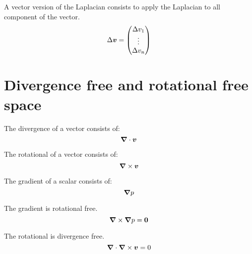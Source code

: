 \begin{definition}
A vector version of the Laplacian consists to apply the Laplacian to all component of the vector.
\begin{equation}
 \Delta {\boldsymbol {v}}=\begin{pmatrix} \Delta v_{1}\\
                  \vdots\\ \Delta v_{n}
                 \end{pmatrix}
\end{equation}
\end{definition}
\section{Divergence free and rotational free space}

\begin{definition}[Divergence]
 The divergence of a vector consists of:
 \begin{equation}
  {\boldsymbol {\nabla}} \cdot {\boldsymbol {v}}
  \end{equation}
\end{definition}

\begin{definition}[Rotational]
 The rotational of a vector consists of:
 \begin{equation}
  {\boldsymbol {\nabla}} \times {\boldsymbol {v}}
 \end{equation}
\end{definition}

\begin{definition}[Gradient]
 The gradient of a scalar consists of:
 \begin{equation}
  {\boldsymbol {\nabla}} p
 \end{equation}
\end{definition}

\begin{property}
 The gradient is rotational free.
 \begin{equation}
  {\boldsymbol {\nabla}}\times {\boldsymbol {\nabla}} p={\boldsymbol {0}}
 \end{equation}
\end{property}

\begin{property}
The rotational is divergence free.
 \begin{equation}
  {\boldsymbol {\nabla}}\cdot {\boldsymbol {\nabla}} \times {\boldsymbol {v}}=0
 \end{equation}
\end{property}

